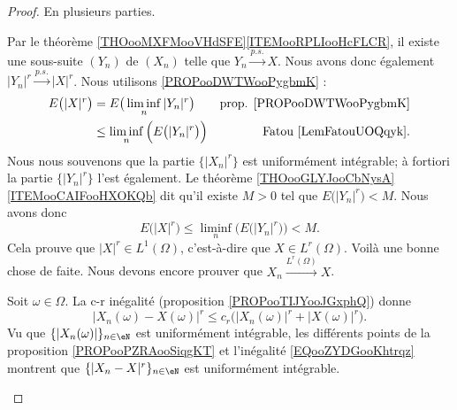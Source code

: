 \begin{proof}
	En plusieurs parties.
	\begin{subproof}
		\spitem[\ref{SPITEMooGKRVooQoDfKm} \( \Rightarrow\) \ref{SPITEMooUYTKooBClYcR}]

		Par le théorème \ref{THOooMXFMooVHdSFE}\ref{ITEMooRPLIooHcFLCR}, il existe une sous-suite \( (Y_n)\) de \( (X_n)\) telle que \( Y_n\stackrel{ p.s.}{\longrightarrow} X\). Nous avons donc également \( | Y_n |^r\stackrel{ p.s.}{\longrightarrow} | X |^r\). Nous utilisons \ref{PROPooDWTWooPygbmK} :
		\begin{subequations}
			\begin{align}
				E\big( | X |^r \big) & =E\big( \liminf_n| Y_n |^r \big)                 & \text{prop. \ref{PROPooDWTWooPygbmK}} \\
				                     & \leq \liminf_n\Big( E\big( | Y_n |^r \big) \Big) & \text{Fatou \ref{LemFatouUOQqyk}}.
			\end{align}
		\end{subequations}
		Nous nous souvenons que la partie \( \{ | X_n |^r \}\) est uniformément intégrable; à fortiori la partie \( \{ | Y_n |^r \}\) l'est également. Le théorème \ref{THOooGLYJooCbNysA}\ref{ITEMooCAIFooHXOKQb} dit qu'il existe \( M>0\) tel que \( E\big( | Y_n |^r \big)<M\). Nous avons donc
		\begin{equation}
			E\big( | X |^r \big)  \leq \liminf_n\Big( E\big( | Y_n |^r \big) \Big) < M.
		\end{equation}
		Cela prouve que \( | X |^r\in L^1(\Omega)\), c'est-à-dire que \( X\in L^r(\Omega)\). Voilà une bonne chose de faite. Nous devons encore prouver que \( X_n\stackrel{ L^r(\Omega)}{\longrightarrow} X\).


		Soit \( \omega\in\Omega\). La c-r inégalité (proposition \ref{PROPooTIJYooJGxphQ}) donne
		\begin{equation}		\label{EQooZYDGooKhtrqz}
			| X_n(\omega)-X(\omega) |^r\leq c_r\big( | X_n(\omega) |^r+| X(\omega) |^r \big).
		\end{equation}
		Vu que \( \{ | X_n(\omega) | \}_{n\in \eN}\) est uniformément intégrable, les différents points de la proposition \ref{PROPooPZRAooSiqgKT} et l'inégalité \ref{EQooZYDGooKhtrqz} montrent que \( \{ | X_n-X |^r \}_{n\in \eN}\) est uniformément intégrable.


\end{subproof}
\end{proof}
